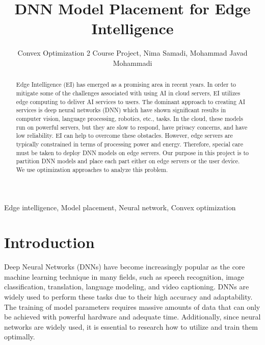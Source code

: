\documentclass[lettersize,journal]{IEEEtran}
\begin{document}
\title{DNN Model Placement for Edge Intelligence}

\author{Convex Optimization 2 Course Project, Nima Samadi, Mohammad Javad Mohammadi}



\maketitle

\begin{abstract}
Edge Intelligence (EI) has emerged as a promising area in recent years. In order to mitigate some of the challenges associated with using AI in cloud servers, EI utilizes edge computing to deliver AI services to users. The dominant approach to creating AI services is deep neural networks (DNN) which have shown significant results in computer vision, language processing, robotics, etc., tasks. In the cloud, these models run on powerful servers, but they are slow to respond, have privacy concerns, and have low reliability. EI can help to overcome these obstacles. However, edge servers are typically constrained in terms of processing power and energy. Therefore, special care must be taken to deploy DNN models on edge servers. Our purpose in this project is to partition DNN models and place each part either on edge servers or the user device. We use optimization approaches to analyze this problem. 
\end{abstract}

\begin{IEEEkeywords}
Edge intelligence, Model placement, Neural network, Convex optimization
\end{IEEEkeywords}

\section{Introduction}

Deep Neural Networks (DNNs) have become increasingly popular as the core machine learning technique in many fields, such as speech recognition, image classification, translation, language modeling, and video captioning. 
DNNs are widely used to perform these tasks due to their high accuracy and adaptability. The training of model parameters requires massive amounts of data that can only be achieved with powerful hardware and adequate time. Additionally, since neural networks are widely used, it is essential to research how to utilize and train them optimally.
\end{document}
